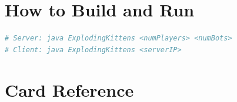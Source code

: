 \section{How to Build and Run}
\label{app:run}

\begin{lstlisting}[language=bash,caption={Build and run.}]
# Server: java ExplodingKittens <numPlayers> <numBots>
# Client: java ExplodingKittens <serverIP>
\end{lstlisting}

\section{Card Reference}
\label{app:cards}
